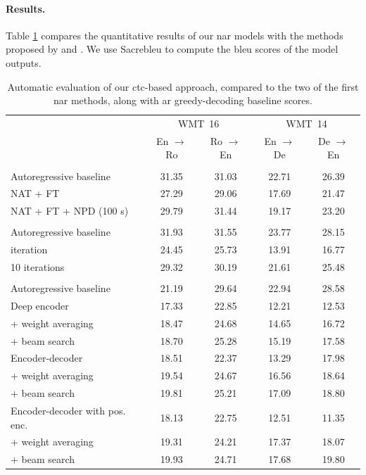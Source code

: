 \paragraph{Results.} Table \ref{tab:end-to-end:bleu} compares the quantitative
results of our \ac{nar} models with the methods proposed by
\citet{gu2017nonautoregressive} and \citet{lee-etal-2018-deterministic}. We use
Sacrebleu \citep{post-2018-call} to compute the \acs{bleu} scores of the model
outputs.

\begin{table}
  \centering
  \begin{tabular}{lcccc}
    \toprule
     & \multicolumn{2}{c}{WMT~16} & \multicolumn{2}{c}{WMT~14} \\
     & En $\rightarrow$ Ro & Ro $\rightarrow$ En & En $\rightarrow$ De & De $\rightarrow$ En \\
    \midrule
    \citet{gu2017nonautoregressive} & & & & \\
    Autoregressive baseline & 31.35 & 31.03 & 22.71 & 26.39 \\
    \addlinespace
    NAT + FT & 27.29 & 29.06 & 17.69 & 21.47 \\
    NAT + FT + NPD (100 s) & 29.79 & 31.44 & 19.17 & 23.20 \\
    \midrule
    \citet{lee-etal-2018-deterministic} & & & & \\
    Autoregressive baseline & 31.93 & 31.55  & 23.77 & 28.15 \\
    \addlinespace
    1 iteration & 24.45 & 25.73 & 13.91 & 16.77 \\
    10 iterations & 29.32 & 30.19 & 21.61 & 25.48 \\
    \midrule
    \citet{libovicky-helcl-2018-end} & & & & \\
    Autoregressive baseline & 21.19 & 29.64 & 22.94 & 28.58 \\
    \addlinespace
    Deep encoder & 17.33 & 22.85 & 12.21 & 12.53 \\
    \quad + weight averaging & 18.47 & 24.68 & 14.65 & 16.72 \\
    \quad + beam search & 18.70 & 25.28 & 15.19 & 17.58 \\
    \addlinespace
    Encoder-decoder  & 18.51 & 22.37 & 13.29 & 17.98 \\
    \quad + weight averaging & 19.54 & 24.67 & 16.56 & 18.64 \\
    \quad + beam search & 19.81 & 25.21 & 17.09 & 18.80  \\
    \addlinespace
    Encoder-decoder with pos. enc. & 18.13 & 22.75 & 12.51 & 11.35 \\
    \quad + weight averaging & 19.31 & 24.21 & 17.37 & 18.07 \\
    \quad + beam search & 19.93 & 24.71 & 17.68 & 19.80 \\
    \bottomrule
  \end{tabular}

  \caption{Automatic evaluation of our \acs{ctc}-based approach, compared to
    the two of the first \acl{nar} methods, along with \acl{ar} greedy-decoding
    baseline scores. }%
  \label{tab:end-to-end:bleu}
\end{table}

